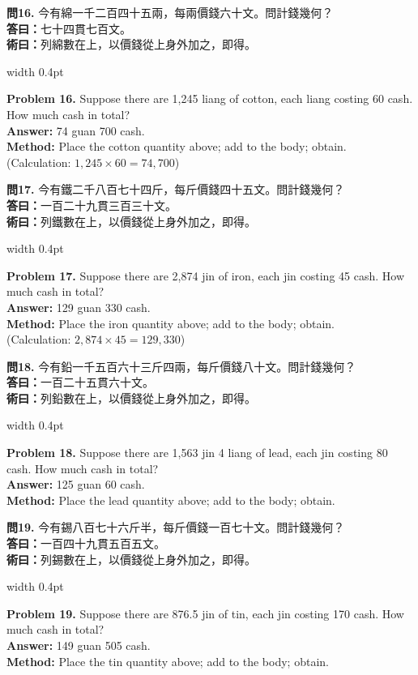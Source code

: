 \documentclass[10pt,a4paper]{article}
\newlength{\cnwidth}
\newlength{\enwidth}
\newcommand{\bilingual}[2]{%
  \noindent%
  \begin{minipage}[t]{\cnwidth}%
    #1%
  \end{minipage}%
  \hfill\vrule width 0.4pt\hfill%
  \begin{minipage}[t]{\enwidth}%
    #2%
  \end{minipage}%
  \par\smallskip%
}
\begin{document}
\bilingual{%
  \textbf{問16.}
  今有綿一千二百四十五兩，每兩價錢六十文。問計錢幾何？\\
  \textbf{答曰：}七十四貫七百文。\\
  \textbf{術曰：}列綿數在上，以價錢從上身外加之，即得。
}{%
  \textbf{Problem 16.}
  Suppose there are 1,245 liang of cotton, each liang costing 60 cash.
  How much cash in total?\\
  \textbf{Answer:} 74 guan 700 cash.\\
  \textbf{Method:} Place the cotton quantity above; add to the body; obtain.\\
  (Calculation: $1{,}245 \times 60 = 74{,}700$)
}

\bilingual{%
  \textbf{問17.}
  今有鐵二千八百七十四斤，每斤價錢四十五文。問計錢幾何？\\
  \textbf{答曰：}一百二十九貫三百三十文。\\
  \textbf{術曰：}列鐵數在上，以價錢從上身外加之，即得。
}{%
  \textbf{Problem 17.}
  Suppose there are 2,874 jin of iron, each jin costing 45 cash.
  How much cash in total?\\
  \textbf{Answer:} 129 guan 330 cash.\\
  \textbf{Method:} Place the iron quantity above; add to the body; obtain.\\
  (Calculation: $2{,}874 \times 45 = 129{,}330$)
}

\bilingual{%
  \textbf{問18.}
  今有鉛一千五百六十三斤四兩，每斤價錢八十文。問計錢幾何？\\
  \textbf{答曰：}一百二十五貫六十文。\\
  \textbf{術曰：}列鉛數在上，以價錢從上身外加之，即得。
}{%
  \textbf{Problem 18.}
  Suppose there are 1,563 jin 4 liang of lead, each jin costing 80 cash.
  How much cash in total?\\
  \textbf{Answer:} 125 guan 60 cash.\\
  \textbf{Method:} Place the lead quantity above; add to the body; obtain.
}

\bilingual{%
  \textbf{問19.}
  今有錫八百七十六斤半，每斤價錢一百七十文。問計錢幾何？\\
  \textbf{答曰：}一百四十九貫五百五文。\\
  \textbf{術曰：}列錫數在上，以價錢從上身外加之，即得。
}{%
  \textbf{Problem 19.}
  Suppose there are 876.5 jin of tin, each jin costing 170 cash.
  How much cash in total?\\
  \textbf{Answer:} 149 guan 505 cash.\\
  \textbf{Method:} Place the tin quantity above; add to the body; obtain.
}
\end{document}
